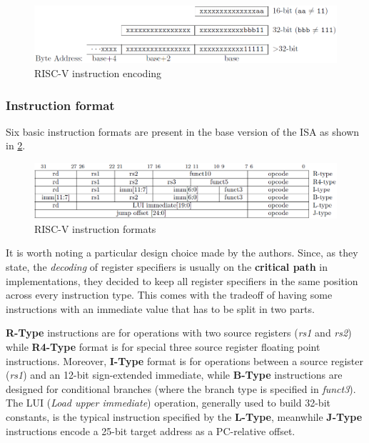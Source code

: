 \documentclass[12pt,oneside,a4paper]{article}
\begin{document}
\begin{figure}[h]
	\centering
	\includegraphics[scale=0.65]{risc-v_encoding}
	\caption{RISC-V instruction encoding}
	\label{riscv:encoding}
\end{figure}

\subsubsection{Instruction format}
Six basic instruction formats are present in the base version of the ISA as shown in \cref{riscv:format}.

\begin{figure}[h]
	\centering
	\includegraphics[scale=0.65]{risc-v_format}
	\caption{RISC-V instruction formats}
	\label{riscv:format}
\end{figure}

It is worth noting a particular design choice made by the authors. Since, as they state, the \textit{decoding} of register specifiers is usually on the \textbf{critical path} in implementations, they decided to keep all register specifiers in the same position across every instruction type. This comes with the tradeoff of having some instructions with an immediate value that has to be split in two parts.

\textbf{R-Type} instructions are for operations with two source registers (\textit{rs1} and \textit{rs2}) while \textbf{R4-Type} format is for special three source register floating point instructions. Moreover, \textbf{I-Type} format is for operations between a source register (\textit{rs1}) and an 12-bit sign-extended immediate, while \textbf{B-Type} instructions are designed for conditional branches (where the branch type is specified in \textit{funct3}).
The LUI (\textit{Load upper immediate}) operation, generally used to build 32-bit constants, is the typical instruction specified by the \textbf{L-Type}, meanwhile \textbf{J-Type} instructions encode a 25-bit target address as a PC-relative offset.
\end{document}
